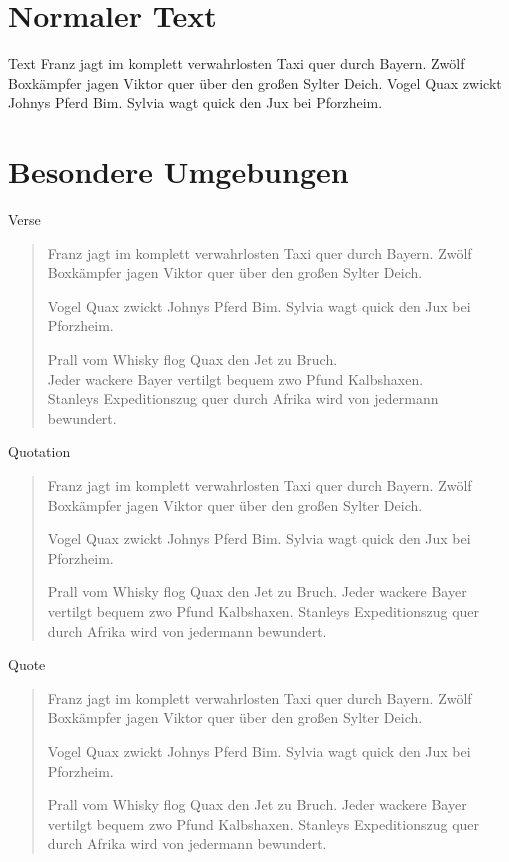 \documentclass[ngerman]{scrartcl}
\begin{document}
	\frame{\partpage}

	\section{Normaler Text}

	\begin{frame}{Text}
		Franz jagt im komplett verwahrlosten Taxi quer durch Bayern.
		Zwölf Boxkämpfer jagen Viktor quer über den großen Sylter Deich.
		Vogel Quax zwickt Johnys Pferd Bim.
		Sylvia wagt quick den Jux bei Pforzheim.
	\end{frame}

	\section{Besondere Umgebungen}

	\begin{frame}{Verse}
		\begin{verse}
			Franz jagt im komplett verwahrlosten Taxi quer durch Bayern.
			Zwölf Boxkämpfer jagen Viktor quer über den großen Sylter Deich.

			Vogel Quax zwickt Johnys Pferd Bim.
			Sylvia wagt quick den Jux bei Pforzheim.

			Prall vom Whisky flog Quax den Jet zu Bruch.\\
			Jeder wackere Bayer vertilgt bequem zwo Pfund Kalbshaxen.\\
			Stanleys Expeditionszug quer durch Afrika wird von jedermann bewundert.\\
		\end{verse}
	\end{frame}

	\begin{frame}{Quotation}
		\begin{quotation}
			Franz jagt im komplett verwahrlosten Taxi quer durch Bayern.
			Zwölf Boxkämpfer jagen Viktor quer über den großen Sylter Deich.

			Vogel Quax zwickt Johnys Pferd Bim.
			Sylvia wagt quick den Jux bei Pforzheim.

			Prall vom Whisky flog Quax den Jet zu Bruch.
			Jeder wackere Bayer vertilgt bequem zwo Pfund Kalbshaxen.
			Stanleys Expeditionszug quer durch Afrika wird von jedermann bewundert.
		\end{quotation}
	\end{frame}

	\begin{frame}{Quote}
		\begin{quote}
			Franz jagt im komplett verwahrlosten Taxi quer durch Bayern.
			Zwölf Boxkämpfer jagen Viktor quer über den großen Sylter Deich.

			Vogel Quax zwickt Johnys Pferd Bim.
			Sylvia wagt quick den Jux bei Pforzheim.

			Prall vom Whisky flog Quax den Jet zu Bruch.
			Jeder wackere Bayer vertilgt bequem zwo Pfund Kalbshaxen.
			Stanleys Expeditionszug quer durch Afrika wird von jedermann bewundert.
		\end{quote}
	\end{frame}
\end{document}
